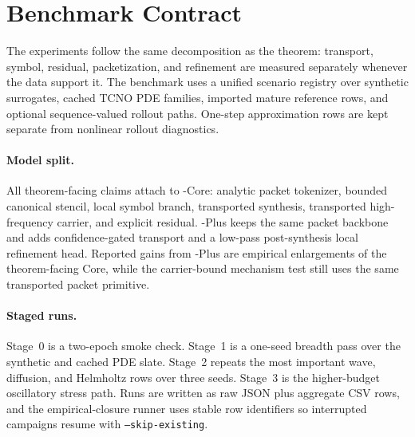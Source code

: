 \section{Benchmark Contract}
\label{sec:training}

The experiments follow the same decomposition as the theorem: transport, symbol, residual, packetization, and refinement are measured separately whenever the data support it.  The benchmark uses a unified scenario registry over synthetic surrogates, cached TCNO PDE families, imported mature reference rows, and optional sequence-valued rollout paths.  One-step approximation rows are kept separate from nonlinear rollout diagnostics.

\paragraph{Model split.}
All theorem-facing claims attach to \MiNO-Core: analytic packet tokenizer, bounded canonical stencil, local symbol branch, transported synthesis, transported high-frequency carrier, and explicit residual.  \MiNO-Plus keeps the same packet backbone and adds confidence-gated transport and a low-pass post-synthesis local refinement head.  Reported gains from \MiNO-Plus are empirical enlargements of the theorem-facing Core, while the carrier-bound mechanism test still uses the same transported packet primitive.

\paragraph{Staged runs.}
Stage~0 is a two-epoch smoke check. Stage~1 is a one-seed breadth pass over the synthetic and cached PDE slate. Stage~2 repeats the most important wave, diffusion, and Helmholtz rows over three seeds. Stage~3 is the higher-budget oscillatory stress path.  Runs are written as raw JSON plus aggregate CSV rows, and the empirical-closure runner uses stable row identifiers so interrupted campaigns resume with \texttt{--skip-existing}.

